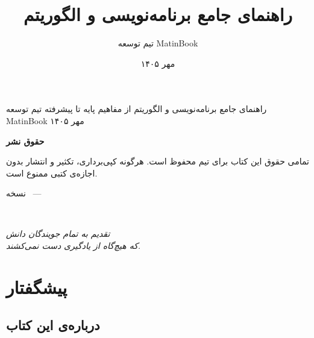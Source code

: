 \documentclass{matinbook}
\title{راهنمای جامع برنامه‌نویسی و الگوریتم}
\author{تیم توسعه MatinBook}
\date{مهر ۱۴۰۵}
\begin{document}
\makecover
    {راهنمای جامع برنامه‌نویسی و الگوریتم}
    {از مفاهیم پایه تا پیشرفته}
    {تیم توسعه MatinBook}
    {مهر ۱۴۰۵}

\frontmatter
\frontmattergeometry

\maketitle

\thispagestyle{empty}
\vfill
\begin{center}
    {\large\textbf{حقوق نشر}}

    \vspace{1cm}

    تمامی حقوق این کتاب برای تیم  محفوظ است.
    هرگونه کپی‌برداری، تکثیر و انتشار بدون اجازه‌ی کتبی ممنوع است.

    \vspace{1cm}

    نسخه \matinbookversion\ — \matinbookdate

    \vspace{1cm}

     \\
\end{center}
\clearpage

\thispagestyle{empty}
\vfill
\begin{flushright}
    {\Large\itshape
        تقدیم به تمام جویندگان دانش\\
        که هیچ‌گاه از یادگیری دست نمی‌کشند.
    }
\end{flushright}
\clearpage

\chapter*{پیشگفتار}

\section*{درباره‌ی این کتاب}
\end{document}
